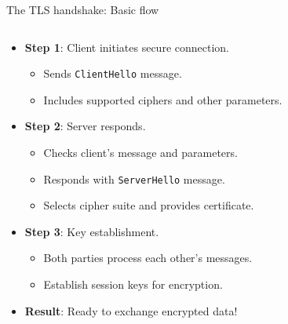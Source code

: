 \documentclass[aspectratio=169, lualatex, handout]{beamer}
\begin{document}
\begin{frame}{The TLS handshake: Basic flow}
	\begin{columns}[c]
		\begin{column}{0.6\textwidth}
			\begin{itemize}[<+->]
				\item \textbf{Step 1}: Client initiates secure connection.
				      \begin{itemize}
					      \item Sends \texttt{ClientHello} message.
					      \item Includes supported ciphers and other parameters.
				      \end{itemize}
				\item \textbf{Step 2}: Server responds.
				      \begin{itemize}
					      \item Checks client's message and parameters.
					      \item Responds with \texttt{ServerHello} message.
					      \item Selects cipher suite and provides certificate.
				      \end{itemize}
				\item \textbf{Step 3}: Key establishment.
				      \begin{itemize}
					      \item Both parties process each other's messages.
					      \item Establish session keys for encryption.
				      \end{itemize}
				\item \textbf{Result}: Ready to exchange encrypted data!
			\end{itemize}
		\end{column}
		\begin{column}{0.4\textwidth}
		\end{column}
	\end{columns}
\end{frame}
\end{document}
